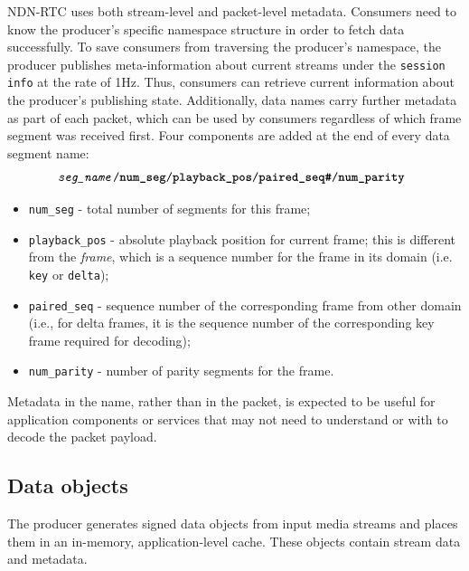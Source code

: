 \documentclass{icn/sig-alternate-2013} %
\newcommand{\ndnrtcName}{NDN-RTC} %
\begin{document}
\ndnrtcName{} uses both stream-level and packet-level metadata. Consumers need to know the producer's specific namespace structure in order to fetch data successfully. To save consumers from traversing the producer's namespace, the producer publishes meta-information about current streams under the \texttt{session info} at the rate of 1Hz. 
Thus, consumers can retrieve current information about the producer's publishing state.
Additionally, data names carry further metadata as part of each packet, which can be used by consumers regardless of which frame segment was received first. 
Four components are added at the end of every data segment name:
\small\begin{equation}
\texttt{\textit{seg\_name}/\textbf{num\_seg}/\textbf{playback\_pos}/\textbf{paired\_seq\#}/\textbf{num\_parity} \nonumber}
\end{equation}\normalsize
\begin{itemize}[label={}]
\item \texttt{num\_seg} - total number of segments for this frame;
\item \texttt{playback\_pos} - absolute playback position for current frame; this is different from the \textit{frame}, which is a sequence number for the frame in its domain (i.e. \texttt{key} or \texttt{delta});
\item \texttt{paired\_seq} - sequence number of the corresponding frame from other domain (i.e., for delta frames, it is the sequence number of the corresponding key frame required for decoding);
\item \texttt{num\_parity} - number of parity segments for the frame.
\end{itemize}
Metadata in the name, rather than in the packet, is expected to be useful for application components or services that may not need to understand or with to decode the packet payload. 
\subsection{Data objects}
The producer generates signed data objects from input media streams and places them in an in-memory, application-level cache.  These objects contain stream data and metadata.
\end{document}
